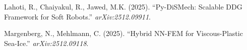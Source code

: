 \documentclass[11pt]{article}
\begin{document}
\begin{enumerate}[label={[\arabic*]}, leftmargin=2em, nosep, itemsep=0.3em]
  \item \label{ref:pydismech} Lahoti, R., Chaiyakul, R., Jawed, M.K. (2025). ``Py-DiSMech: Scalable DDG Framework for Soft Robots.'' \textit{arXiv:2512.09911}. \label{cite:pydismech}

  \item \label{ref:margenberg} Margenberg, N., Mehlmann, C. (2025). ``Hybrid NN-FEM for Viscous-Plastic Sea-Ice.'' \textit{arXiv:2512.09118}. \label{cite:margenberg}
\end{enumerate}


\end{document}
